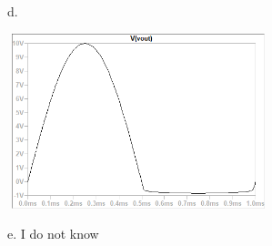 d.

\includegraphics[width=3in,height=2in]{../../Images/OPampsTransistorsDiodesQ15d.png}


e. I do not know \\
